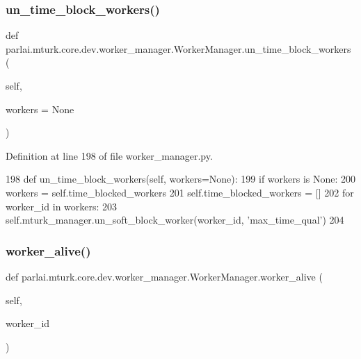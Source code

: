 \subsubsection{\texorpdfstring{un\+\_\+time\+\_\+block\+\_\+workers()}{un\_time\_block\_workers()}}
{\footnotesize\ttfamily def parlai.\+mturk.\+core.\+dev.\+worker\+\_\+manager.\+Worker\+Manager.\+un\+\_\+time\+\_\+block\+\_\+workers (\begin{DoxyParamCaption}\item[{}]{self,  }\item[{}]{workers = {\ttfamily None} }\end{DoxyParamCaption})}



Definition at line 198 of file worker\+\_\+manager.\+py.


\begin{DoxyCode}
198     \textcolor{keyword}{def }un\_time\_block\_workers(self, workers=None):
199         \textcolor{keywordflow}{if} workers \textcolor{keywordflow}{is} \textcolor{keywordtype}{None}:
200             workers = self.time\_blocked\_workers
201             self.time\_blocked\_workers = []
202         \textcolor{keywordflow}{for} worker\_id \textcolor{keywordflow}{in} workers:
203             self.mturk\_manager.un\_soft\_block\_worker(worker\_id, \textcolor{stringliteral}{'max\_time\_qual'})
204 
\end{DoxyCode}
\mbox{\label{classparlai_1_1mturk_1_1core_1_1dev_1_1worker__manager_1_1WorkerManager_a4ac41d78677e2ad337be38ee4d68cea3}} 
\subsubsection{\texorpdfstring{worker\+\_\+alive()}{worker\_alive()}}
{\footnotesize\ttfamily def parlai.\+mturk.\+core.\+dev.\+worker\+\_\+manager.\+Worker\+Manager.\+worker\+\_\+alive (\begin{DoxyParamCaption}\item[{}]{self,  }\item[{}]{worker\+\_\+id }\end{DoxyParamCaption})}

